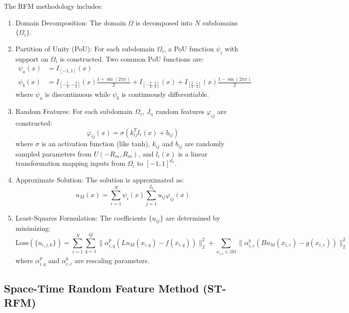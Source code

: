 \documentclass[11pt]{article}
\begin{document}
The RFM methodology includes:
\begin{enumerate}
    \item Domain Decomposition: The domain $\Omega$ is decomposed into $N$ subdomains $\{\Omega_i\}$.
    
    \item Partition of Unity (PoU): For each subdomain $\Omega_i$, a PoU function $\psi_i$ with support on $\Omega_i$ is constructed. Two common PoU functions are:
    \begin{align}
        \psi_a(x) &= I_{[-1,1]}(x) \\
        \psi_b(x) &= I_{[-\frac{5}{4},-\frac{3}{4}]}(x)\frac{1 + \sin(2\pi x)}{2} + I_{[-\frac{3}{4},\frac{3}{4}]}(x) + I_{[\frac{3}{4},\frac{5}{4}]}(x)\frac{1 - \sin(2\pi x)}{2}
    \end{align}
    where $\psi_a$ is discontinuous while $\psi_b$ is continuously differentiable.
    
    \item Random Features: For each subdomain $\Omega_i$, $J_n$ random features $\varphi_{ij}$ are constructed:
    \begin{equation}
        \varphi_{ij}(x) = \sigma(k_{ij}^T l_i(x) + b_{ij})
    \end{equation}
    where $\sigma$ is an activation function (like tanh), $k_{ij}$ and $b_{ij}$ are randomly sampled parameters from $U(-R_m, R_m)$, and $l_i(x)$ is a linear transformation mapping inputs from $\Omega_i$ to $[-1,1]^{d_x}$.
    
    \item Approximate Solution: The solution is approximated as:
    \begin{equation}
        u_M(x) = \sum_{i=1}^{N} \psi_i(x) \sum_{j=1}^{J_n} u_{ij} \varphi_{ij}(x)
    \end{equation}
    
    \item Least-Squares Formulation: The coefficients $\{u_{ij}\}$ are determined by minimizing:
    \begin{equation}
        \text{Loss}(\{u_{i,j,k}\}) = \sum_{i=1}^{N} \sum_{q=1}^{Q} \| \alpha^p_{i,q} (Lu_M(x_{i,q}) - f(x_{i,q})) \|_2^2 + \sum_{x_{i,e} \in \partial\Omega} \| \alpha^b_{i,e} (Bu_M(x_{i,e}) - g(x_{i,e})) \|_2^2
    \end{equation}
    where $\alpha^p_{i,q}$ and $\alpha^b_{i,e}$ are rescaling parameters.
\end{enumerate}

\subsection{Space-Time Random Feature Method (ST-RFM)}
\end{document}
